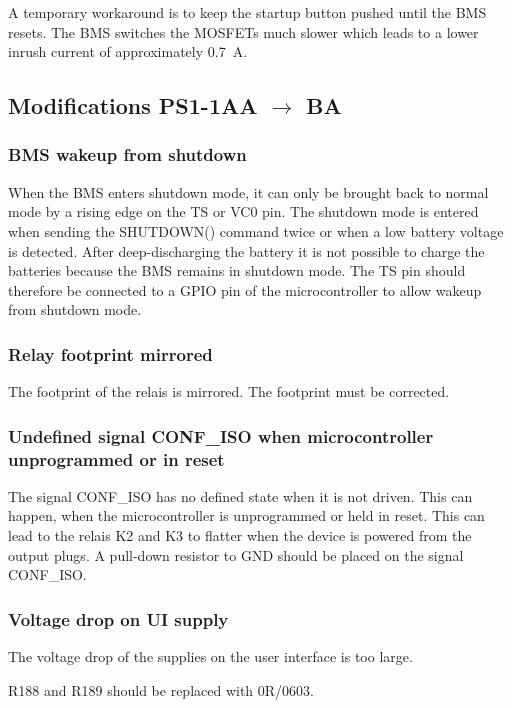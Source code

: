 A temporary workaround is to keep the startup button pushed until the BMS resets. The BMS switches the \acp{MOSFET} much slower which leads to a lower inrush current of approximately \qty{0.7}{\ampere}. 


\subsection{Modifications PS1-1AA $\to$ BA}

\subsubsection{BMS wakeup from shutdown}
When the BMS enters shutdown mode, it can only be brought back to normal mode by a rising edge on the TS or VC0 pin. The shutdown mode is entered when sending the SHUTDOWN() command twice or when a low battery voltage is detected. After deep-discharging the battery it is not possible to charge the batteries because the BMS remains in shutdown mode. The TS pin should therefore be connected to a GPIO pin of the microcontroller to allow wakeup from shutdown mode. 

\subsubsection{Relay footprint mirrored}
The footprint of the relais is mirrored. The footprint must be corrected. 

\subsubsection{Undefined signal CONF\_ISO when microcontroller unprogrammed or in reset}
The signal CONF\_ISO has no defined state when it is not driven. This can happen, when the microcontroller is unprogrammed or held in reset. This can lead to the relais K2 and K3 to flatter when the device is powered from the output plugs. 
A pull-down resistor to GND should be placed on the signal CONF\_ISO. 

\subsubsection{Voltage drop on UI supply}
The voltage drop of the supplies on the user interface is too large. 

R188 and R189 should be replaced with 0R/0603. 

